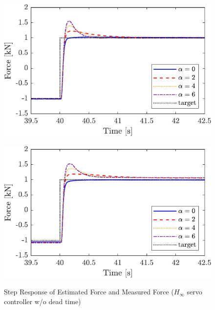 \begin{figure}[t]
    \begin{minipage}{\minipageratio\hsize}
    \centering
        \includegraphics[keepaspectratio, scale = \minifigscale]{contents/ForceControl/figure/1115/crop-1115_JFPSHinf_estforce_step.pdf}
        \label{fig4:crop-1115_JFPSHinf_estforce_step}
    \end{minipage}
    \begin{minipage}{\minipageratio\hsize}
    \centering
        \includegraphics[keepaspectratio, scale = \minifigscale]{contents/ForceControl/figure/1115/crop-1115_JFPSHinf_force_step.pdf}
        \label{fig4:crop-1115_JFPSHinf_force_step}
    \end{minipage}
    \caption{Step Response of Estimated Force and Measured Force ($H_\infty$ servo controller w/o dead time)}   
    \label{fig4:crop-1115_JFPSHinf_step}
\end{figure}
